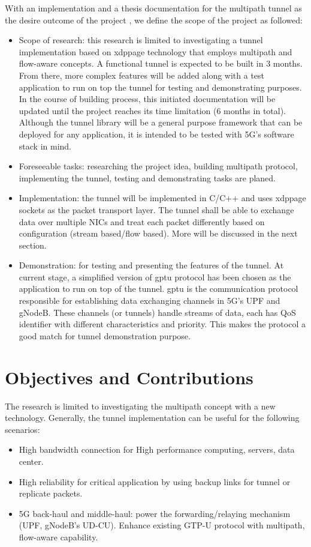 With an implementation and a thesis documentation for the multipath tunnel as the desire outcome of the project , we define the scope of the project as followed:
\begin{itemize}
    \item Scope of research: this research is limited to investigating a tunnel implementation based on \ac{xdppage} technology that employs multipath and flow-aware concepts. A functional tunnel is expected to be built in 3 months. From there, more complex features will be added along with a test application to run on top the tunnel for testing and demonstrating purposes. In the course of building process, this initiated documentation will be updated until the project reaches its time limitation (6 months in total). Although the tunnel library will be a general purpose framework that can be deployed for any application, it is intended to be tested with 5G's software stack in mind.
    \item Foreseeable tasks: researching the project idea, building multipath protocol, implementing the tunnel, testing and demonstrating tasks are planed. 
    \item Implementation: the tunnel will be implemented in C/C++ and uses \ac{xdppage} sockets as the packet transport layer. The tunnel shall be able to exchange data over multiple \ac{NIC}s and treat each packet differently based on configuration (stream based/flow based). More will be discussed in the next section.
    \item Demonstration: for testing and presenting the features of the tunnel. At current stage, a simplified version of \ac{gptu} protocol has been chosen as the application to run on top of the tunnel. \ac{gptu} is the communication protocol responsible for establishing data exchanging channels in 5G's \ac{UPF} and gNodeB. These channels (or tunnels) handle streams of data, each has \ac{QoS} identifier with different characteristics and priority. This makes the protocol a good match for tunnel demonstration purpose.
\end{itemize}


\section{Objectives and Contributions}
The research is limited to investigating the multipath concept with a new technology. 
Generally, the tunnel implementation can be useful for the following scenarios:
\begin{itemize}
    \item High bandwidth connection for High performance computing, servers, data center.
    \item High reliability for critical application by using backup links for tunnel or replicate packets.
    \item 5G back-haul and middle-haul: power the forwarding/relaying mechanism (\ac{UPF}, gNodeB's UD-CU). Enhance existing GTP-U protocol with multipath, flow-aware capability.
\end{itemize}

